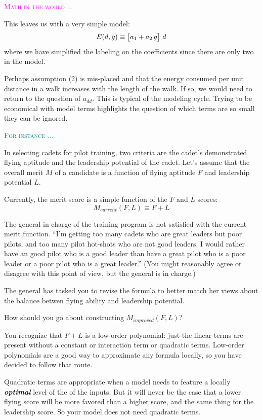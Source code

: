 \documentclass[
  letterpaper,
  DIV=11,
  numbers=noendperiod,
  oneside]{scrreprt}
\newenvironment{example}%
{%
\textcolor{teal}{\hrulefill}%
  \par\vspace{.3\baselineskip}%
  \textcolor{teal}{\scshape For instance ...}%
  \par\vspace{\baselineskip}%
}%
{\textcolor{teal}{\hrulefill}}
\newenvironment{intheworld}%
{%
\textcolor{magenta}{\hrulefill}%
  \par\vspace{.3\baselineskip}%
  \textcolor{magenta}{\scshape Math in the world ...}%
  \par\vspace{\baselineskip}%
}%
{\textcolor{magenta}{\hrulefill}}
\begin{document}
\begin{intheworld}
This leaves us with a very simple model:
\[E(d, g) \equiv \left[\strut a_1 + a_2\, g\right]\, d\] where we have
simplified the labeling on the coefficients since there are only two in
the model.

Perhaps assumption (2) is mis-placed and that the energy consumed per
unit distance in a walk increases with the length of the walk. If so, we
would need to return to the question of \(a_{dd}\). This is typical of
the modeling cycle. Trying to be economical with model terms highlights
the question of which terms are so small they can be ignored.

\end{intheworld}

\begin{example}
In selecting cadets for pilot training, two criteria are the cadet's
demonstrated flying aptitude and the leadership potential of the cadet.
Let's assume that the overall merit \(M\) of a candidate is a function
of flying aptitude \(F\) and leadership potential \(L\).

Currently, the merit score is a simple function of the \(F\) and \(L\)
scores: \[M_{current}(F, L) \equiv F + L\]

The general in charge of the training program is not satisfied with the
current merit function. ``I'm getting too many cadets who are great
leaders but poor pilots, and too many pilot hot-shots who are not good
leaders. I would rather have an good pilot who is a good leader than
have a great pilot who is a poor leader or a poor pilot who is a great
leader.'' (You might reasonably agree or disagree with this point of
view, but the general is in charge.)

The general has tasked you to revise the formula to better match her
views about the balance betwen flying ability and leadership potential.

How should you go about constructing \(M_{improved}(F, L)\)?

You recognize that \(F + L\) is a low-order polynomial: just the linear
terms are present without a constant or interaction term or quadratic
terms. Low-order polynomials are a good way to approximate any formula
locally, so you have decided to follow that route.

Quadratic terms are appropriate when a model needs to feature a locally
\textbf{\emph{optimal}} level of the of the inputs. But it will never be
the case that a lower flying score will be more favored than a higher
score, and the same thing for the leadership score. So your model does
not need quadratic terms.


\end{example}
\end{document}
